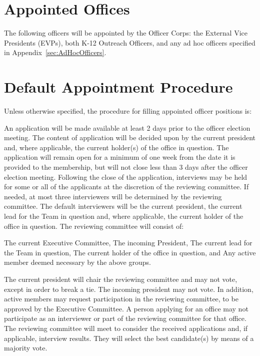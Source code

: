 \section{Appointed Offices}\label{sec:appointedofficers}
The following officers will be appointed by the Officer Corps: the External Vice Presidents (EVPs), both K-12 Outreach Officers, and any ad hoc officers specified in Appendix~\ref{sec:AdHocOfficers}.
\section{Default Appointment Procedure}
Unless otherwise specified, the procedure for filling appointed officer positions is:
\begin{enumsubsection}
	\itemnotoc An application will be made available at least 2 days prior to the officer election meeting.
	\itemnotoc The content of application will be decided upon by the current president and, where applicable, the current holder(s) of the office in question.
	\itemnotoc The application will remain open for a minimum of one week from the date it is provided to the membership, but will not close less than 3 days after the officer election meeting.
	\itemnotoc Following the close of the application, interviews may be held for some or all of the applicants at the discretion of the reviewing committee.
	If needed, at most three interviewers will be determined by the reviewing committee.
	The default interviewers will be the current president, the current lead for the Team in question and, where applicable, the current holder of the office in question.
	\itemnotoc The reviewing committee will consist of: \label{sec:defaultappointcomp}
	\begin{enumsubsubsection}
		\itemnotoc The current Executive Committee,
		\itemnotoc The incoming President,
		\itemnotoc The current lead for the Team in question,
		\itemnotoc The current holder of the office in question, and
		\itemnotoc Any active member deemed necessary by the above groups.
	\end{enumsubsubsection}
	The current president will chair the reviewing committee and may not vote, except in order to break a tie.
	The incoming president may not vote.
	In addition, active members may request participation in the reviewing committee, to be approved by the Executive Committee.
	\itemnotoc A person applying for an office may not participate as an interviewer or part of the reviewing committee for that office.
	\label{sec:defaultappointmentrestrictions}
	\itemnotoc The reviewing committee will meet to consider the received applications and, if applicable, interview results.
	They will select the best candidate(s) by means of a majority vote.
\end{enumsubsection}
